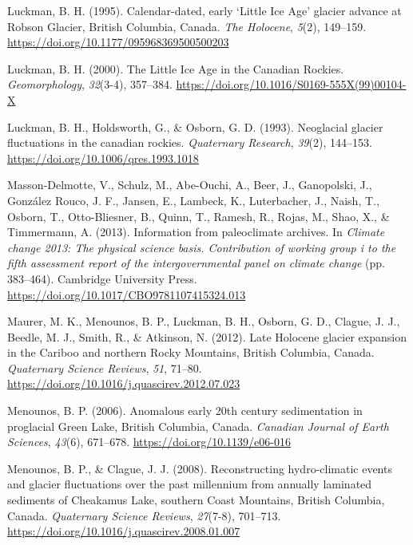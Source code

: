 \documentclass[
  letterpaper,
  DIV=11,
  numbers=noendperiod]{scrartcl}
\newlength{\cslhangindent}
\newlength{\cslentryspacingunit} %
\newenvironment{CSLReferences}[2] %
 {%
  \setlength{\parindent}{0pt}
  \ifodd #1
  \let\oldpar\par
  \def\par{\hangindent=\cslhangindent\oldpar}
  \fi
  \setlength{\parskip}{#2\cslentryspacingunit}
 }%
 {}
\begin{document}
\begin{CSLReferences}{1}{0}
\leavevmode{}%
Luckman, B. H. (1995). {Calendar-dated, early `Little Ice Age' glacier
advance at Robson Glacier, British Columbia, Canada}. \emph{The
Holocene}, \emph{5}(2), 149--159.
\url{https://doi.org/10.1177/095968369500500203}

\leavevmode{}%
Luckman, B. H. (2000). {The Little Ice Age in the Canadian Rockies}.
\emph{Geomorphology}, \emph{32}(3-4), 357--384.
\url{https://doi.org/10.1016/S0169-555X(99)00104-X}

\leavevmode{}%
Luckman, B. H., Holdsworth, G., \& Osborn, G. D. (1993). {Neoglacial
glacier fluctuations in the canadian rockies}. \emph{Quaternary
Research}, \emph{39}(2), 144--153.
\url{https://doi.org/10.1006/qres.1993.1018}

\leavevmode{}%
Masson-Delmotte, V., Schulz, M., Abe-Ouchi, A., Beer, J., Ganopolski,
J., González Rouco, J. F., Jansen, E., Lambeck, K., Luterbacher, J.,
Naish, T., Osborn, T., Otto-Bliesner, B., Quinn, T., Ramesh, R., Rojas,
M., Shao, X., \& Timmermann, A. (2013). {Information from paleoclimate
archives}. In \emph{Climate change 2013: The physical science basis.
Contribution of working group i to the fifth assessment report of the
intergovernmental panel on climate change} (pp. 383--464). Cambridge
University Press. \url{https://doi.org/10.1017/CBO9781107415324.013}

\leavevmode{}%
Maurer, M. K., Menounos, B. P., Luckman, B. H., Osborn, G. D., Clague,
J. J., Beedle, M. J., Smith, R., \& Atkinson, N. (2012). {Late Holocene
glacier expansion in the Cariboo and northern Rocky Mountains, British
Columbia, Canada}. \emph{Quaternary Science Reviews}, \emph{51}, 71--80.
\url{https://doi.org/10.1016/j.quascirev.2012.07.023}

\leavevmode{}%
Menounos, B. P. (2006). {Anomalous early 20th century sedimentation in
proglacial Green Lake, British Columbia, Canada}. \emph{Canadian Journal
of Earth Sciences}, \emph{43}(6), 671--678.
\url{https://doi.org/10.1139/e06-016}

\leavevmode{}%
Menounos, B. P., \& Clague, J. J. (2008). {Reconstructing hydro-climatic
events and glacier fluctuations over the past millennium from annually
laminated sediments of Cheakamus Lake, southern Coast Mountains, British
Columbia, Canada}. \emph{Quaternary Science Reviews}, \emph{27}(7-8),
701--713. \url{https://doi.org/10.1016/j.quascirev.2008.01.007}


\end{CSLReferences}
\end{document}
